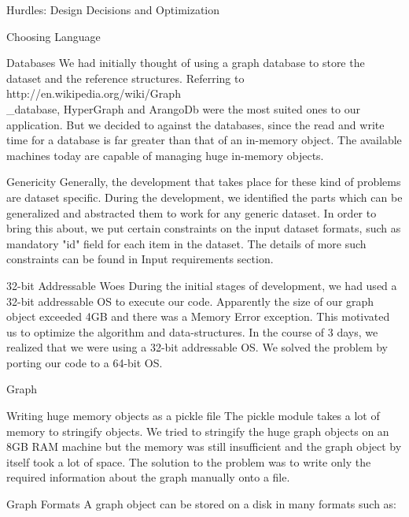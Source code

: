 \documentclass{report}
\begin{document}
\begin{projChapter}{Hurdles: Design Decisions and Optimization}
\begin{projSection}{Choosing Language}
\end{projSection}
\begin{projSection}{Databases}
            We had initially thought of using a graph database to store the dataset and the reference structures. Referring to http://en.wikipedia.org/wiki/Graph\\\_database, HyperGraph and ArangoDb were the most suited ones to our application. But we decided to against the databases, since the read and write time for a database is far greater than that of an in-memory object. The available machines today are capable of managing huge in-memory objects.
        \end{projSection}
\begin{projSection}{Genericity}
            Generally, the development that takes place for these kind of problems are dataset specific. During the development, we identified the parts which can be generalized and abstracted them to work for any generic dataset. In order to bring this about, we put certain constraints on the input dataset formats, such as mandatory "id" field for each item in the dataset. The details of more such constraints can be found in Input requirements section.
        \end{projSection}
\begin{projSection}{32-bit Addressable Woes}
            During the initial stages of development, we had used a 32-bit addressable OS to execute our code. Apparently the size of our graph object exceeded 4GB and there was a Memory Error exception. This motivated us to optimize the algorithm and data-structures. In the course of 3 days, we realized that we were using a 32-bit addressable OS. We solved the problem by porting our code to a 64-bit OS.
        \end{projSection}
\begin{projSection}{Graph}
\begin{projSubSection}{Writing huge memory objects as a pickle file}
                The pickle module takes a lot of memory to stringify objects. We tried to stringify the huge graph objects on an 8GB RAM machine but the memory was still insufficient and the graph object by itself took a lot of space. The solution to the problem was to write only the required information about the graph manually onto a file.
            \end{projSubSection}
\begin{projSubSection}{Graph Formats}
                A graph object can be stored on a disk in many formats such as:
                

\end{projSubSection}
\end{projSection}
\end{projChapter}
\end{document}

